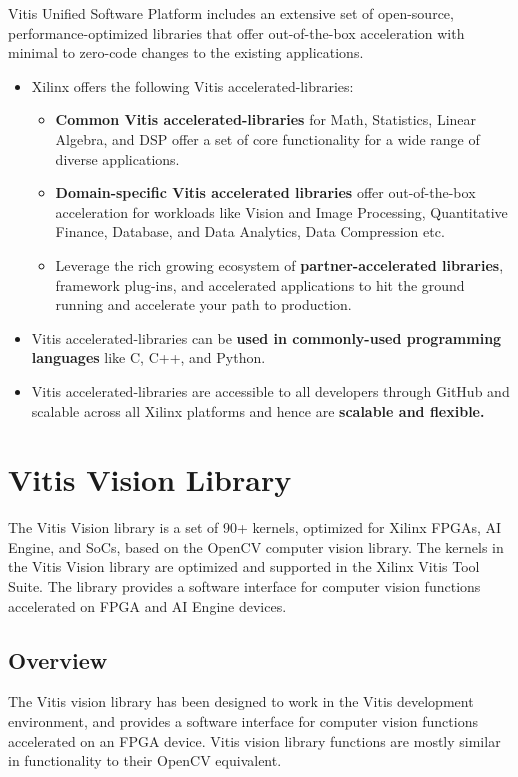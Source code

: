 
Vitis Unified Software Platform includes an extensive set of open-source, performance-optimized libraries that offer out-of-the-box acceleration with minimal to zero-code changes to the existing applications.

\begin{itemize}
    \item Xilinx offers the following Vitis accelerated-libraries:
    \begin{itemize}
        \item \textbf{Common Vitis accelerated-libraries} for Math, Statistics, Linear Algebra, and DSP offer a set of core functionality for a wide range of diverse applications.
        \item \textbf{Domain-specific Vitis accelerated libraries} offer out-of-the-box acceleration for workloads like Vision and Image Processing, Quantitative Finance, Database, and Data Analytics, Data Compression etc.    
        \item Leverage the rich growing ecosystem of \textbf{partner-accelerated libraries}, framework plug-ins, and accelerated applications to hit the ground running and accelerate your path to production.
    \end{itemize}
    \item Vitis accelerated-libraries can be \textbf{used in commonly-used programming languages} like C, C++, and Python.
    \item Vitis accelerated-libraries are accessible to all developers through GitHub and scalable across all Xilinx platforms and hence are \textbf{scalable and flexible.}
\end{itemize}

\section{Vitis Vision Library}
The Vitis Vision library is a set of 90+ kernels, optimized for Xilinx FPGAs, AI Engine, and SoCs, based on the OpenCV computer vision library. The kernels in the Vitis Vision library are optimized and supported in the Xilinx Vitis Tool Suite. The library provides a software interface for computer vision functions accelerated on FPGA and AI Engine devices.

\subsection{Overview}
The Vitis vision library has been designed to work in the Vitis development environment, and provides a software interface for computer vision functions accelerated on an FPGA device. Vitis vision library functions are mostly similar in functionality to their OpenCV equivalent. 

